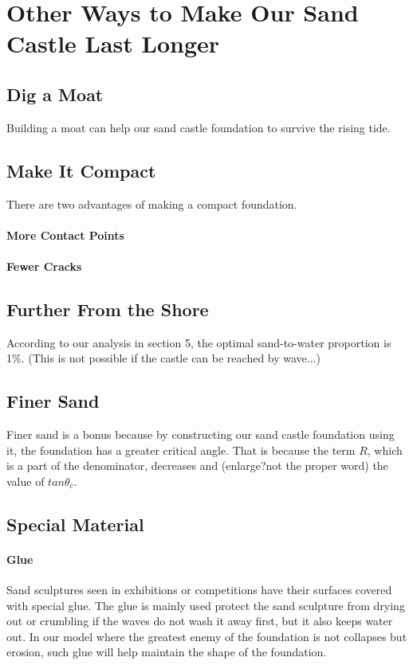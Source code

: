 \documentclass[12pt]{article}
\begin{document}
\section{Other Ways to Make Our Sand Castle Last Longer}
\subsection{Dig a Moat}
Building a moat can help our sand castle foundation to survive the rising tide.
\subsection{Make It Compact}
There are two advantages of making a compact foundation.
\paragraph{More Contact Points}
\paragraph{Fewer Cracks}
\subsection{Further From the Shore}
According to our analysis in section 5, the optimal sand-to-water proportion is 1\%.
(This is not possible if the castle can be reached by wave...)
\subsection{Finer Sand}
Finer sand is a bonus because by constructing our sand castle foundation using it, the foundation has a greater critical angle. That is because the term $R$, which is a part of the denominator, decreases and (enlarge?not the proper word) the value of $tan\theta_c$.
\subsection{Special Material}
\paragraph{Glue}
Sand sculptures seen in exhibitions or competitions have their surfaces covered with special glue. The glue is mainly used protect the sand sculpture from drying out or crumbling if the waves do not wash it away first, but it also keeps water out. In our model where the greatest enemy of the foundation is not collapses but erosion, such glue will help maintain the shape of the foundation.
\end{document}
